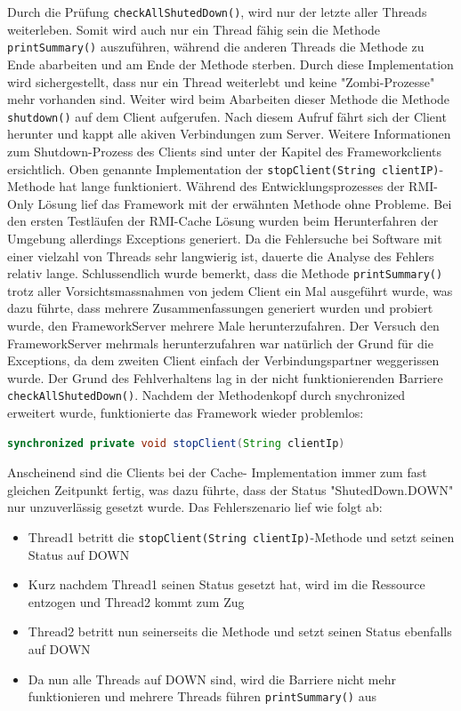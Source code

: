 Durch die Prüfung \texttt{checkAllShutedDown()}, wird nur der letzte aller Threads weiterleben. Somit wird auch nur ein Thread fähig sein die Methode \texttt{printSummary()} auszuführen, während die anderen Threads die Methode zu Ende abarbeiten und am Ende der Methode sterben. Durch diese Implementation wird sichergestellt, dass nur ein Thread weiterlebt und keine "Zombi-Prozesse" mehr vorhanden sind.\newline
Weiter wird beim Abarbeiten dieser Methode die Methode \texttt{shutdown()} auf dem Client aufgerufen. Nach diesem Aufruf fährt sich der Client herunter und kappt alle akiven Verbindungen zum Server. Weitere Informationen zum Shutdown-Prozess des Clients sind unter der Kapitel des Frameworkclients ersichtlich.\newline
Oben genannte Implementation der \texttt{stopClient(String clientIP)}-Methode hat lange funktioniert. Während des Entwicklungsprozesses der RMI-Only Lösung lief das Framework mit der erwähnten Methode ohne Probleme. Bei den ersten Testläufen der RMI-Cache Lösung wurden beim Herunterfahren der Umgebung allerdings Exceptions generiert. Da die Fehlersuche bei Software mit einer vielzahl von Threads sehr langwierig ist, dauerte die Analyse des Fehlers relativ lange.\newline 
Schlussendlich wurde bemerkt, dass die Methode \texttt{printSummary()} trotz aller Vorsichtsmassnahmen von jedem Client ein Mal ausgeführt wurde, was dazu führte, dass mehrere Zusammenfassungen generiert wurden und probiert wurde, den FrameworkServer mehrere Male herunterzufahren. Der Versuch den FrameworkServer mehrmals herunterzufahren war natürlich der Grund für die Ex\-cep\-tions, da dem zweiten Client ein\-fach der Ver\-bin\-dungs\-part\-ner weggerissen wurde.\newline
Der Grund des Fehlverhaltens lag in der nicht funktionierenden Barriere \texttt{checkAllShutedDown()}. Nachdem der Methodenkopf durch snychronized erweitert wurde, funktionierte das Framework wieder problemlos:
\begin{lstlisting}[language=java, breaklines=true]
synchronized private void stopClient(String clientIp)
\end{lstlisting}
Anscheinend sind die Clients bei der Cache- Implementation immer zum fast gleichen Zeit\-punkt fer\-tig, was dazu führte, dass der Sta\-tus "ShutedDown.DOWN" nur un\-zu\-ver\-läs\-sig gesetzt wurde.\newline
Das Fehlerszenario lief wie folgt ab:
\begin{itemize}
\item Thread1 betritt die \texttt{stopClient(String clientIp)}-Methode und setzt seinen Status auf DOWN
\item Kurz nachdem Thread1 seinen Status gesetzt hat, wird im die Res\-sour\-ce entzogen und Thread2 kommt zum Zug
\item Thread2 betritt nun seinerseits die Methode und setzt seinen Status ebenfalls auf DOWN
\item Da nun alle Threads auf DOWN sind, wird die Barriere nicht mehr funktionieren und mehrere Threads führen \texttt{printSummary()} aus
\end{itemize}
